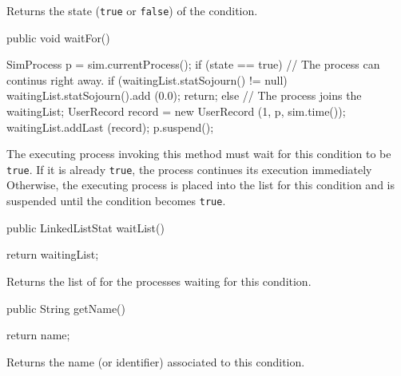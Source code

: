  \begin{tabb}  Returns the state (\texttt{true} or \texttt{false}) of the condition.
 \end{tabb}
\begin{htmlonly}
\end{htmlonly}
\begin{code}

   public void waitFor() \begin{hide} {
      SimProcess p = sim.currentProcess();
      if (state == true) {
         // The process can continus right away.
         if (waitingList.statSojourn() != null)
            waitingList.statSojourn().add (0.0);
         return;
      }
      else {
         // The process joins the waitingList;
         UserRecord record = new UserRecord (1, p, sim.time());
         waitingList.addLast (record);
         p.suspend();
      }
   }\end{hide}
\end{code}
 \begin{tabb}  The executing process invoking this method
  must wait for this condition to be \texttt{true}.
  If it is already \texttt{true}, the 
  process continues its execution immediately
   Otherwise, the executing process is placed into the 
    list for this condition and is suspended
   until the condition becomes \texttt{true}.
 \end{tabb}
\begin{code}

   public LinkedListStat waitList() \begin{hide} { 
      return waitingList;
   }\end{hide}
\end{code}
 \begin{tabb}  Returns the list of 
   for the processes waiting for this condition.
 \end{tabb}
\begin{htmlonly}
\end{htmlonly}
\begin{code}

   public String getName()\begin{hide} {
      return name;
   }\end{hide}
\end{code}
\begin{tabb}   Returns the name (or identifier) associated
  to this condition.
\end{tabb}
